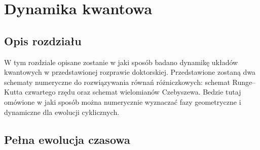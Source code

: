 \chapter{Dynamika kwantowa}\label{chap:dynamics}

\section*{Opis rozdziału}

W tym rozdziale opisane zostanie w jaki sposób badano dynamikę układów kwantowych w przedstawionej rozprawie doktorskiej.
Przedstawione zostaną dwa schematy numeryczne do rozwiązywania równań różniczkowych: schemat Runge--Kutta czwartego rzędu oraz schemat wielomianów Czebyszewa.
Bedzie tutaj omówione w jaki sposób można numerycznie wyznaczać fazy geometryczne i dynamiczne dla ewolucji cyklicznych.

\section{Pełna ewolucja czasowa}

